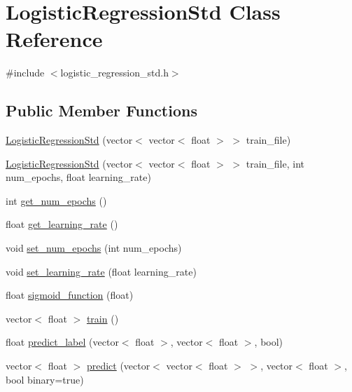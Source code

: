 \hypertarget{classLogisticRegressionStd}{}\section{Logistic\+Regression\+Std Class Reference}
\label{classLogisticRegressionStd}


{\ttfamily \#include $<$logistic\+\_\+regression\+\_\+std.\+h$>$}

\subsection*{Public Member Functions}
\begin{DoxyCompactItemize}
\item 
\hyperlink{classLogisticRegressionStd_a22ba912061af2c3886dcd2bba021a813}{Logistic\+Regression\+Std} (vector$<$ vector$<$ float $>$ $>$ train\+\_\+file)
\item 
\hyperlink{classLogisticRegressionStd_a8d9374c3af263323b0f9f783162e1a98}{Logistic\+Regression\+Std} (vector$<$ vector$<$ float $>$ $>$ train\+\_\+file, int num\+\_\+epochs, float learning\+\_\+rate)
\item 
int \hyperlink{classLogisticRegressionStd_a2efe3855fe471c6899529a2ecb95f56f}{get\+\_\+num\+\_\+epochs} ()
\item 
float \hyperlink{classLogisticRegressionStd_ae6038eea55bcbdfc25086b5f486f5c6f}{get\+\_\+learning\+\_\+rate} ()
\item 
void \hyperlink{classLogisticRegressionStd_a496e5025ae0b5e1f91539dcacc3b708e}{set\+\_\+num\+\_\+epochs} (int num\+\_\+epochs)
\item 
void \hyperlink{classLogisticRegressionStd_a8c751c719e3f23431601e844d727aa29}{set\+\_\+learning\+\_\+rate} (float learning\+\_\+rate)
\item 
float \hyperlink{classLogisticRegressionStd_a7171a6c804319894543dffd928e95c12}{sigmoid\+\_\+function} (float)
\item 
vector$<$ float $>$ \hyperlink{classLogisticRegressionStd_ab165dfd866aa94f54913fae1c7654797}{train} ()
\item 
float \hyperlink{classLogisticRegressionStd_ab3099375fe4881bb9dd19fbc973e5a29}{predict\+\_\+label} (vector$<$ float $>$, vector$<$ float $>$, bool)
\item 
vector$<$ float $>$ \hyperlink{classLogisticRegressionStd_a72426e5570bd4385149f5fb517c7eced}{predict} (vector$<$ vector$<$ float $>$ $>$, vector$<$ float $>$, bool binary=true)
\end{DoxyCompactItemize}


